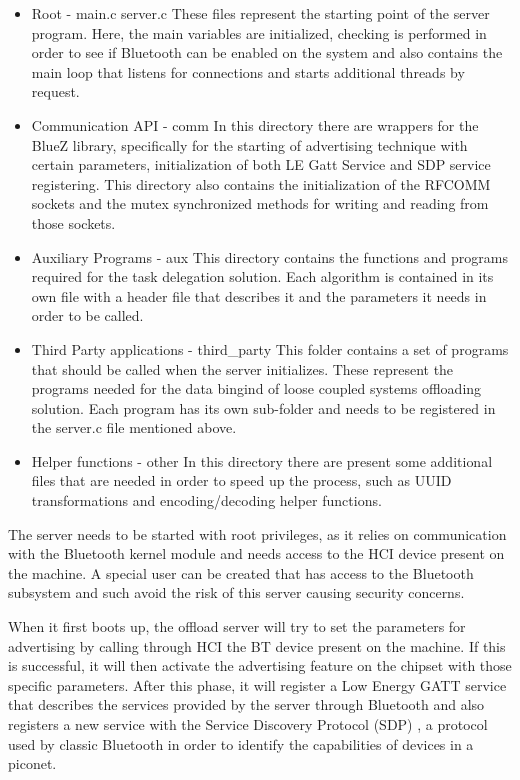 \begin{itemize}

\item{Root - main.c server.c}
	These files represent the starting point of the server program. Here, the main variables are initialized, checking is performed in order to see if Bluetooth can be enabled on the system and also contains the main loop that listens for connections and starts additional threads by request.

\item{Communication API - comm}
	In this directory there are wrappers for the BlueZ library, specifically for the starting of advertising technique with certain parameters, initialization of both LE Gatt Service and SDP service registering. This directory also contains the initialization of the RFCOMM sockets and the mutex synchronized methods for writing and reading from those sockets.

\item{Auxiliary Programs - aux}
	This directory contains the functions and programs required for the task delegation solution. Each algorithm is contained in its own file with a header file that describes it and the parameters it needs in order to be called.
	
\item{Third Party applications - third_party}
	This folder contains a set of programs that should be called when the server initializes. These represent the programs needed for the data bingind of loose coupled systems offloading solution. Each program has its own sub-folder and needs to be registered in the server.c file mentioned above.
	
\item{Helper functions - other}
	In this directory there are present some additional files that are needed in order to speed up the process, such as UUID transformations and encoding/decoding helper functions.

\end{itemize}


The server needs to be started with root privileges, as it relies on communication with the Bluetooth kernel module and needs access to the HCI device present on the machine. A special user can be created that has access to the Bluetooth subsystem and such avoid the risk of this server causing security concerns.

When it first boots up, the offload server will try to set the parameters for advertising by calling through HCI the BT device present on the machine. If this is successful, it will then activate the advertising feature on the chipset with those specific parameters. After this phase, it will register a Low Energy GATT service that describes the services provided by the server through Bluetooth and also registers a new service with the Service Discovery Protocol (SDP) , a protocol used by classic Bluetooth in order to identify the capabilities of devices in a piconet.

